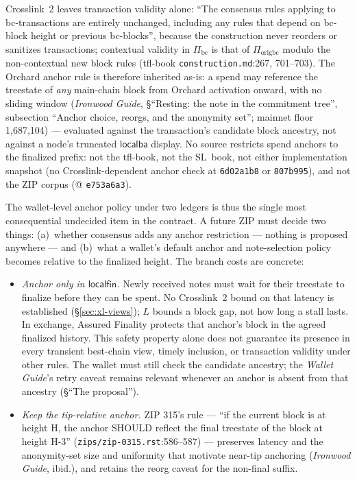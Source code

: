 \documentclass[11pt,a4paper]{article}
\theoremstyle{definition}
\begin{document}
Crosslink~2 leaves transaction validity alone: ``The consensus rules
applying to bc-transactions are entirely unchanged, including any rules
that depend on bc-block height or previous bc-blocks'', because the
construction never reorders or sanitizes transactions; contextual validity
in $\Pi_{\mathrm{bc}}$ is that of $\Pi_{\mathrm{origbc}}$ modulo the
non-contextual new block rules (tfl-book \texttt{construction.md}:267,
701--703). The Orchard anchor rule is therefore inherited as-is: a spend
may reference the treestate of \emph{any} main-chain block from Orchard
activation onward, with no sliding window (\emph{Ironwood Guide},
\S``Resting: the note in the commitment tree'', subsection ``Anchor choice,
reorgs, and the anonymity set''; mainnet floor 1{,}687{,}104)
--- evaluated against the transaction's candidate block ancestry, not
against a node's truncated $\mathsf{localba}$ display. No
source restricts spend anchors to the finalized prefix: not the tfl-book,
not the SL~book, not either implementation snapshot (no
Crosslink-dependent anchor check at \texttt{6d02a1b8} or
\texttt{807b995}), and not the ZIP corpus (@ \texttt{e753a6a3}).

The wallet-level anchor policy under two ledgers is thus the single most
consequential undecided item in the contract. A future ZIP must decide
two things: (a)~whether consensus adds any anchor restriction --- nothing
is proposed anywhere --- and (b)~what a wallet's default anchor and
note-selection policy becomes relative to the finalized height. The
branch costs are concrete:
\begin{itemize}
\item \emph{Anchor only in $\mathsf{localfin}$.} Newly received notes
  must wait for their treestate to finalize before they can be spent.
  No Crosslink~2 bound on that latency is established
  (\S\ref{sec:xl-views}); $L$ bounds a block gap, not how long a stall
  lasts. In
  exchange, Assured Finality protects that anchor's block in the agreed
  finalized history. This safety property alone does not guarantee its
  presence in every transient best-chain view, timely inclusion, or
  transaction validity under other rules. The wallet must still check
  the candidate ancestry; the \emph{Wallet Guide}'s retry caveat remains
  relevant whenever an anchor is absent from that ancestry
  (\S``The proposal'').
\item \emph{Keep the tip-relative anchor.} ZIP 315's rule --- ``if the
  current block is at height H, the anchor SHOULD reflect the final
  treestate of the block at height H-3'' (\texttt{zips/zip-0315.rst}:586--587)
  --- preserves latency and the anonymity-set size and uniformity that
  motivate near-tip anchoring (\emph{Ironwood Guide}, ibid.), and retains
  the reorg caveat for the non-final suffix.
\end{itemize}
\end{document}
